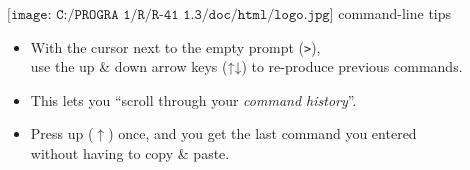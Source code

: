 \documentclass[
  ignorenonframetext,
]{beamer}
\newcommand{\AlertTok}[1]{\textcolor[rgb]{0.94,0.16,0.16}{#1}}
\newcommand{\OtherTok}[1]{\textcolor[rgb]{0.56,0.35,0.01}{#1}}
\begin{document}
\begin{frame}{\(\texttt{[image: C:/PROGRA~1/R/R-41~1.3/doc/html/logo.jpg]}\)
command-line tips}
\protect\hypertarget{includegraphicsheight1emcprogra1rr-411.3dochtmllogo.jpg-command-line-tips}{}
\begin{itemize}
\item
  With the cursor next to the empty prompt (\OtherTok{\texttt{>}}),\\
  use the up \& down \AlertTok{arrow keys} (↑↓) to re-produce previous
  commands.
\item
  This lets you ``scroll through your \emph{command history}''.
\item
  Press \AlertTok{up} (\AlertTok{$\uparrow$}) once, and you get the last
  command you entered\\
  without having to copy \& paste.
\end{itemize}
\end{frame}
\end{document}
